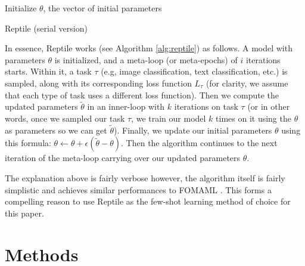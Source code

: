 \documentclass[a4paper]{book}
\begin{document}
\IncMargin{1em}
\begin{algorithm}
Initialize $\theta$, the vector of initial parameters


\caption{Reptile (serial version)}
\label{alg:reptile}
\end{algorithm}
\DecMargin{1em}

In essence, Reptile works (see Algorithm \ref{alg:reptile}) as follows. A model with parameters $\theta$ is initialized, and a meta-loop (or meta-epochs) of $i$ iterations starts. Within it, a task $\tau$ (e.g, image classification, text classification, etc.) is sampled, along with its corresponding loss function $L_{\tau}$ (for clarity, we assume that each type of task uses a different loss function). Then we compute the updated parameters $\tilde \theta$ in an inner-loop with $k$ iterations on task $\tau$ (or in other words, once we sampled our task $\tau$, we train our model $k$ times on it using the $\theta$ as parameters so we can get $\tilde \theta$). Finally, we update our initial parameters $\theta$ using this formula: $\theta \leftarrow \theta + \epsilon (\tilde{\theta} - \theta)$. Then the algorithm continues to the next iteration of the meta-loop carrying over our updated parameters $\theta$.

The explanation above is fairly verbose however, the algorithm itself is fairly simplistic and achieves similar performances to FOMAML \parencite{nichol_first-order_2018}. This forms a compelling reason to use Reptile as the few-shot learning method of choice for this paper.

\chapter{Methods}\label{chap:methods}
\end{document}

